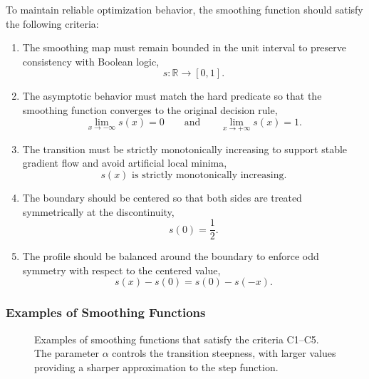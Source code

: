 To maintain reliable optimization behavior, the smoothing function should satisfy the following criteria:
\begin{enumerate}
\item[C1)]
  The smoothing map must remain bounded in the unit interval to preserve consistency with Boolean logic,
  \begin{equation}
    s: \mathbb{R} \rightarrow [0,1].
  \end{equation}

\item[C2)]
The asymptotic behavior must match the hard predicate so that the smoothing function converges to the original decision rule,
\begin{equation}
  \lim_{x\rightarrow -\infty} s(x) = 0
  \qquad \text{and} \qquad
  \lim_{x\rightarrow +\infty} s(x) = 1.
\end{equation}

\item[C3)]
The transition must be strictly monotonically increasing to support stable gradient flow and avoid artificial local minima,
\begin{equation}
s(x) \text{ is strictly monotonically increasing}.
\end{equation}

\item[C4)]
The boundary should be centered so that both sides are treated symmetrically at the discontinuity,
\begin{equation}
s(0) = \frac{1}{2}.
\end{equation}

\item[C5)]
The profile should be balanced around the boundary to enforce odd symmetry with respect to the centered value,
\begin{equation}
s(x) - s(0) = s(0) - s(-x).
\end{equation}
\end{enumerate}

\subsubsection{Examples of Smoothing Functions}
\begin{figure}
\caption{Examples of smoothing functions that satisfy the criteria C1--C5. The parameter $\alpha$ controls the transition steepness, with larger values providing a sharper approximation to the step function.}
\end{figure}

